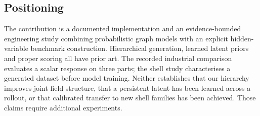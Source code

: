 \subsection{Positioning}
\label{sec:related:gap}

The contribution is a documented implementation and an evidence-bounded
engineering study combining probabilistic graph models with an explicit
hidden-variable benchmark construction. Hierarchical generation, learned
latent priors and proper scoring all have prior art. The recorded industrial
comparison evaluates a scalar response on three parts; the shell study
characterises a generated dataset before model training. Neither establishes
that our hierarchy improves joint field structure, that a persistent latent
has been learned across a rollout, or that calibrated transfer to new shell
families has been achieved. Those claims require additional experiments.

